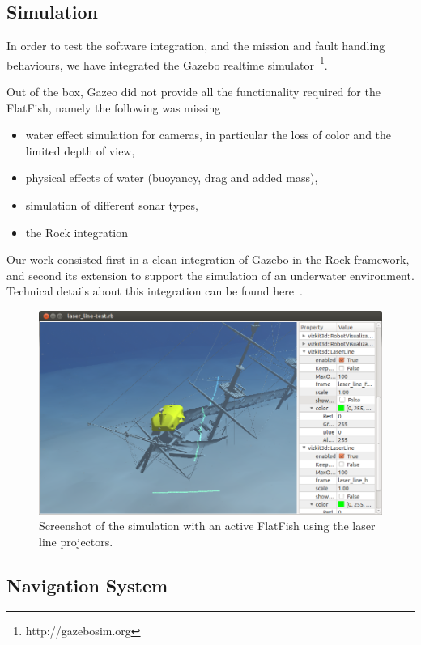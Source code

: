 \documentclass[conference]{IEEEtran}
\begin{document}
\subsection{Simulation}

In order to test the software integration, and the mission and fault handling behaviours,
we have integrated the Gazebo realtime simulator~\footnote{http://gazebosim.org}.

Out of the box, Gazeo did not provide all the functionality required for the FlatFish,
namely the following was missing
\begin{itemize}
    \item water effect simulation for cameras, in particular the loss of color and the
        limited depth of view,
    \item physical effects of water (buoyancy, drag and added mass),
    \item simulation of different sonar types,
    \item the Rock integration
\end{itemize}

Our work consisted first in a clean integration of Gazebo in the Rock framework, and
second its extension to support the simulation of an underwater environment. Technical
details about this integration can be found here~\cite{watanabe2015}.

\begin{figure}[!t]
	\centering
	\includegraphics[width=0.9\columnwidth]{flatfish_simulation}
	\caption{Screenshot of the simulation with an active FlatFish using the laser line 
	projectors.}
	\label{fig:simulation}
\end{figure}


\subsection{Navigation System}
\label{sec:nav}
\end{document}
